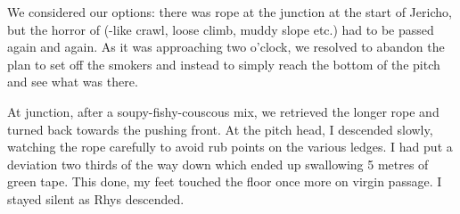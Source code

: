 We considered our options: there was rope at the junction at the start of Jericho, but the horror of  (-like crawl, loose climb, muddy slope etc.) had to be passed again and again. As it was approaching two o'clock, we resolved to abandon the plan to set off the smokers and instead to simply reach the bottom of the pitch and see what was there.

At  junction, after a soupy-fishy-couscous mix, we retrieved the longer rope and turned back towards the pushing front. At the pitch head, I descended slowly, watching the rope carefully to avoid rub points on the various ledges. I had put a deviation two thirds of the way down which ended up swallowing 5 metres of green tape. This done, my feet touched the floor once more on virgin passage. I stayed silent as Rhys descended.

